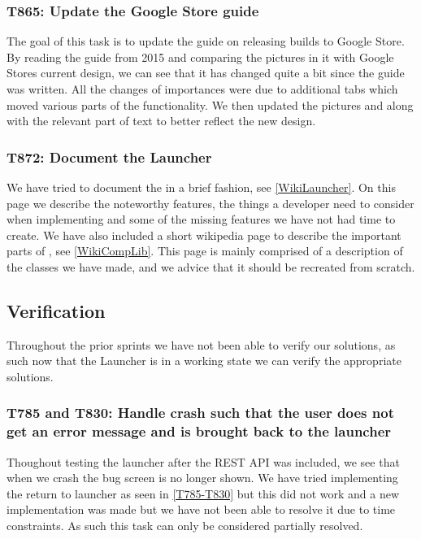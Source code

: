 \subsubsection{T865: Update the Google Store guide}
The goal of this task is to update the guide on releasing builds to Google
Store. By reading the guide from 2015 and comparing the pictures in it with
Google Stores current design, we can see that it has changed quite a bit since
the guide was written. All the changes of importances were due to additional
tabs which moved various parts of the functionality. We then updated the
pictures and along with the relevant part of text to better reflect the new
design.

\subsubsection{T872: Document the Launcher}
We have tried to document the  in a brief fashion, see
\autoref{WikiLauncher}. On this page we describe the noteworthy features, the
things a developer need to consider when implementing  and some of
the missing features we have not had time to create. We have also included a
short wikipedia page to describe the important parts of ,
see \autoref{WikiCompLib}. This page is mainly comprised of a description of the
classes we have made, and we advice that it should be recreated from scratch.

\subsection{Verification}
Throughout the prior sprints we have not been able to verify our solutions, as
such now that the Launcher is in a working state we can verify the appropriate
solutions.

\subsubsection{T785 and T830: Handle crash such that the user does not get an
error message and is brought back to the launcher}
Thoughout testing the launcher after the REST API was included, we see that when
we crash the bug screen is no longer shown. We have tried implementing the
return to launcher as seen in \autoref{T785-T830} but this did not work and a
new implementation was made but we have not been able to resolve it due
to time constraints.
As such this task can only be considered partially resolved.

